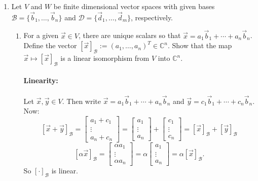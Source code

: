 \documentclass{article}
\begin{document}
\begin{enumerate} 
    \item Let $V$ and $W$ be finite dimensional vector spaces with given bases $\mathcal{B} = \{\vec{b}_1,\ldots,\vec{b}_n\}$ and $\mathcal{D} = \{\vec{d}_1,\ldots,\vec{d}_m\}$, respectively.
      \begin{enumerate}
        \item For a given $\vec{x} \in V$, there are unique scalars so that $\vec{x} = a_1\vec{b}_1 + \cdots + a_n\vec{b}_n$. Define the vector $[\vec{x}]_{\mathcal{B}} := (a_1,\ldots,a_n)^T \in \mathbb{C}^n$. Show that the map $\vec{x} \mapsto [\vec{x}]_{\mathcal{B}}$ is a linear isomorphism from $V$ into $\mathbb{C}^n$.

          \paragraph{Linearity: }Let $\vec{x},\vec{y}\in V$. Then write $\vec{x} = a_1\vec{b}_1 + \cdots + a_n\vec{b}_n$ and $\vec{y} = c_1\vec{b}_1 + \cdots + c_n\vec{b}_n$. Now:
          \[
              [\vec{x}+\vec{y}]_{\mathcal{B}}=\begin{bmatrix} a_1+c_1\\\vdots\\ a_n+c_n \end{bmatrix} 
            =\begin{bmatrix} a_1\\\vdots\\ a_n \end{bmatrix} 
            +\begin{bmatrix} c_1\\\vdots\\ c_n \end{bmatrix} 
            =[\vec{x}   ]_{\mathcal{B}}
            +[\vec{y}   ]_{\mathcal{B}}
          \] 
           \[
               [\alpha\vec{x}]_\mathcal{B}=\begin{bmatrix} \alpha a_1\\\vdots \\ \alpha a_n \end{bmatrix} 
               =\alpha \begin{bmatrix} a_1\\\vdots\\ a_n \end{bmatrix} 
               =\alpha[\vec{x}]_{\mathcal{B}}
          .\] 
          So $[\cdot ]_{\mathcal{B}}$ is linear. 


\end{enumerate}
\end{enumerate}
\end{document}
